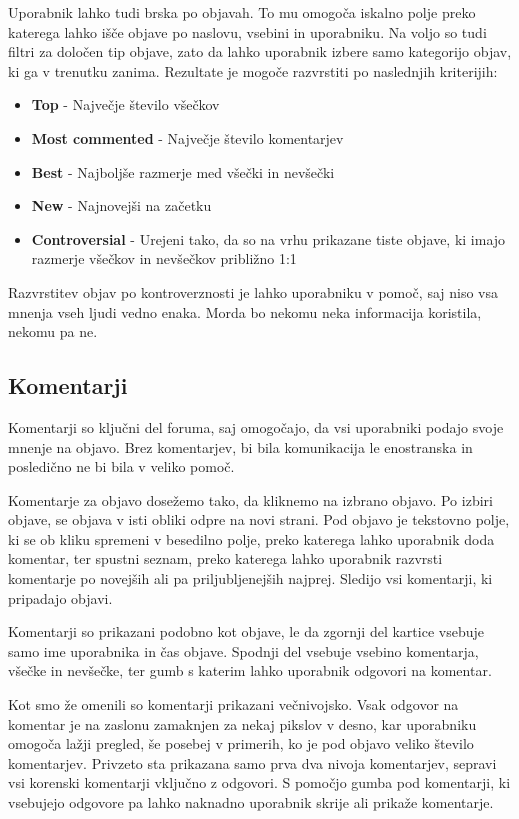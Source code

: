 \documentclass[a4paper,12pt,openright]{book}
\begin{document}
Uporabnik lahko tudi brska po objavah.
To mu omogoča iskalno polje preko katerega lahko išče objave po naslovu, vsebini in uporabniku.
Na voljo so tudi filtri za določen tip objave, zato da lahko uporabnik izbere samo kategorijo objav, ki ga v trenutku zanima.
Rezultate je mogoče razvrstiti po naslednjih kriterijih:
\begin{itemize}
    \item \textbf{Top} - Največje število všečkov
    \item \textbf{Most commented} - Največje število komentarjev
    \item \textbf{Best} - Najboljše razmerje med všečki in nevšečki
    \item \textbf{New} - Najnovejši na začetku
    \item \textbf{Controversial} - Urejeni tako, da so na vrhu prikazane tiste objave, ki imajo razmerje všečkov in nevšečkov približno 1:1
\end{itemize}
Razvrstitev objav po kontroverznosti je lahko uporabniku v pomoč, saj niso vsa mnenja vseh ljudi vedno enaka.
Morda bo nekomu neka informacija koristila, nekomu pa ne.

\subsection{Komentarji}
Komentarji so ključni del foruma, saj omogočajo, da vsi uporabniki podajo svoje mnenje na objavo.
Brez komentarjev, bi bila komunikacija le enostranska in posledično ne bi bila v veliko pomoč.

Komentarje za objavo dosežemo tako, da kliknemo na izbrano objavo.
Po izbiri objave, se objava v isti obliki odpre na novi strani.
Pod objavo je tekstovno polje, ki se ob kliku spremeni v besedilno polje, preko katerega lahko uporabnik doda komentar, ter spustni seznam, preko katerega lahko uporabnik razvrsti komentarje po novejših ali pa priljubljenejših najprej.
Sledijo vsi komentarji, ki pripadajo objavi.

Komentarji so prikazani podobno kot objave, le da zgornji del kartice vsebuje samo ime uporabnika in čas objave.
Spodnji del vsebuje vsebino komentarja, všečke in nevšečke, ter gumb s katerim lahko uporabnik odgovori na komentar.

Kot smo že omenili so komentarji prikazani večnivojsko.
Vsak odgovor na komentar je na zaslonu zamaknjen za nekaj pikslov v desno, kar uporabniku omogoča lažji pregled, še posebej v primerih, ko je pod objavo veliko število komentarjev.
Privzeto sta prikazana samo prva dva nivoja komentarjev, sepravi vsi korenski komentarji vključno z odgovori.
S pomočjo gumba pod komentarji, ki vsebujejo odgovore pa lahko naknadno uporabnik skrije ali prikaže komentarje.
\end{document}
